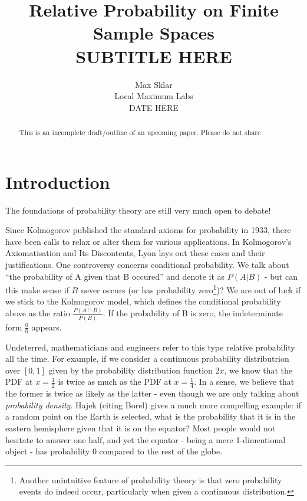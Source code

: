 \documentclass[twoside]{article}
\newcommand{\quotes}[1]{``#1''}
\theoremstyle{plain}%
\theoremstyle{definition}
\theoremstyle{remark}
\begin{document}
\parindent=0in
\parskip=12pt


\title{
  Relative Probability on Finite Sample Spaces \\
  \large{
    SUBTITLE HERE
  }
}

\author{Max Sklar\\ Local Maximum Labs \\ DATE HERE}
\date{}

\maketitle
\thispagestyle{empty}

\begin{abstract}
This is an incomplete draft/outline of an upcoming paper. Please do not share
\end{abstract}

\tableofcontents
\newpage

\section{Introduction}

The foundations of probability theory are still very much open to debate!

Since Kolmogorov published the standard axioms for probability\cite{kolmogorov} in 1933, there have been calls to relax or alter them for various applications. In Kolmogorov's Axiomatisation and Its Discontents\cite{lyon}, Lyon lays out these cases and their justifications.
One controversy concerns conditional probability. We talk about \quotes{the probability of A given that B occured} and denote it as \(P(A|B)\) - but can this make sense if \(B\) never occurs (or has probability zero\footnote{Another unintuitive feature of probability theory is that zero probability events do indeed occur, particularly when given a continuous distribution.})? We are out of luck if we stick to the Kolmogorov model, which defines the conditional probability above as the ratio \(\frac{P(A \cap B)}{P(B)}\). If the probability of B is zero, the indeterminate form \(\frac{0}{0}\) appears.

Undeterred, mathematicians and engineers refer to this type relative probability all the time. For example, if we consider a continuous probability distributrion over \([0, 1]\) given by the probability distribution function \(2x\), we know that the PDF at \(x = \frac{1}{2}\) is twice as much as the PDF at \(x = \frac{1}{4}\). In a sense, we believe that the former is twice as likely as the latter - even though we are only talking about \textit{probability density}. Hajek\cite{hajek} (citing Borel) gives a much more compelling example: if a random point on the Earth is selected, what is the probability that it is in the eastern hemisphere given that it is on the equator? Most people would not hesitate to answer one half, and yet the equator - being a mere 1-dimentional object - has probability 0 compared to the rest of the globe.
\end{document}
